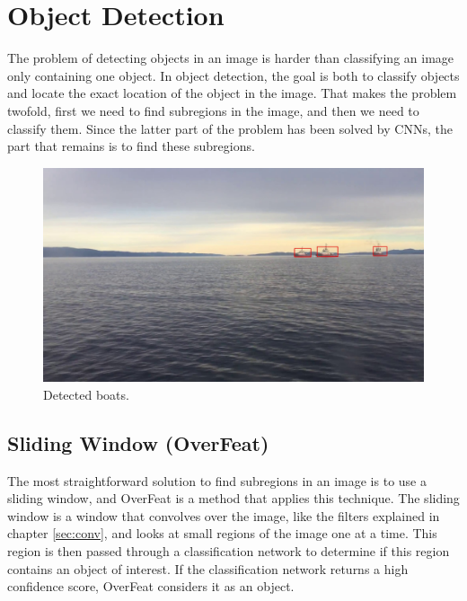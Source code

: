 


\chapter{Object Detection}
\label{sec:obj_det}
The problem of detecting objects in an image is harder than classifying an image only containing one object. In object detection, the goal is both to classify objects and locate the exact location of the object in the image. That makes the problem twofold, first we need to find subregions in the image, and then we need to classify them. Since the latter part of the problem has been solved by CNNs, the part that remains is to find these subregions. 

\begin{figure}[h!]
    \centering
    \includegraphics[width = 0.8 \textwidth]{results/video/video3/frame677.jpg}
    \caption{Detected boats.}
    \label{fig:boat_detection}
\end{figure}


\section{Sliding Window (OverFeat)}
The most straightforward solution to find subregions in an image is to use a sliding window, and OverFeat \citep{Sermanet2013} is a method that applies this technique. The sliding window is a window that convolves over the image, like the filters explained in chapter \ref{sec:conv}, and looks at small regions of the image one at a time. This region is then passed through a classification network to determine if this region contains an object of interest. If the classification network returns a high confidence score, OverFeat considers it as an object. 

\vspace{3mm}

